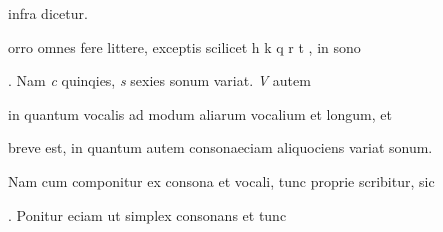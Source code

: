 \renewcommand{\theFancyVerbLine}{\textcolor{green}{06-38\alph{FancyVerbLine}}}


\begin{VerbatimLatin}[firstnumber=1]
infra dicetur.

\indentK {}orro omnes fere littere, exceptis scilicet  h  k q r t , in sono 

\end{VerbatimLatin}
\renewcommand{\theFancyVerbLine}{06-\arabic{FancyVerbLine}\phantom{a}}
%
\begin{VerbatimLatin}[firstnumber=39]
. Nam \textit{c} quinqies, \textit{s} sexies sonum variat. \textit{V} autem

in quantum vocalis ad modum aliarum vocalium et longum, et

breve est, in quantum autem consonaeciam aliquociens variat sonum.

Nam cum componitur ex consona et vocali, tunc proprie scribitur, sic

 . Ponitur eciam ut simplex consonans et tunc
\end{VerbatimLatin}

